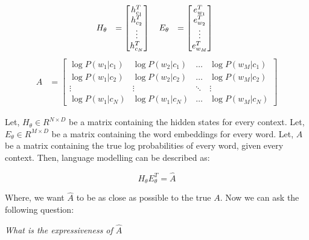 \begin{displaymath}
    \begin{matrix}
        H_\theta &= \begin{bmatrix}
               h^T_{c_1} \\
               h^T_{c_2} \\
               \vdots \\
               h^T_{c_N}
              \end{bmatrix}
        \ \ \      
        E_\theta &= \begin{bmatrix}
           e^T_{w_1} \\
           e^T_{w_2} \\
           \vdots \\
           e^T_{w_M}
          \end{bmatrix}
    \end{matrix} \\
\end{displaymath}
\begin{displaymath}
    \begin{matrix}
    A &= \begin{bmatrix}
       \log P(w_1 | c_1) & \log P(w_2 | c_1) & \hdots & \log P(w_M | c_1)  \\
       \log P(w_1 | c_2) & \log P(w_2 | c_2) & \hdots & \log P(w_M | c_2) \\
       \vdots & \vdots & \ddots & \vdots \\
       \log P(w_1 | c_N) & \log P(w_1 | c_N) & \hdots & \log P(w_M | c_N)
      \end{bmatrix}
    \end{matrix}
\end{displaymath}

Let, $ H_\theta \in R^{N \times D} $ be a matrix containing the hidden states for every context. Let, $ E_\theta \in R^{M \times D}$ be a matrix containing the word embeddings for every word. Let, $ A $ be a matrix containing the true log probabilities of every word, given every context. Then, language modelling can be described as:

\begin{displaymath}
    H_\theta E^T_\theta = \hat A
\end{displaymath}

Where, we want $ \hat A $ to be as close as possible to the true $ A $. Now we can ask the following question:

\begin{center}
    \emph{What is the expressiveness of $ \hat{A} $}
\end{center}






